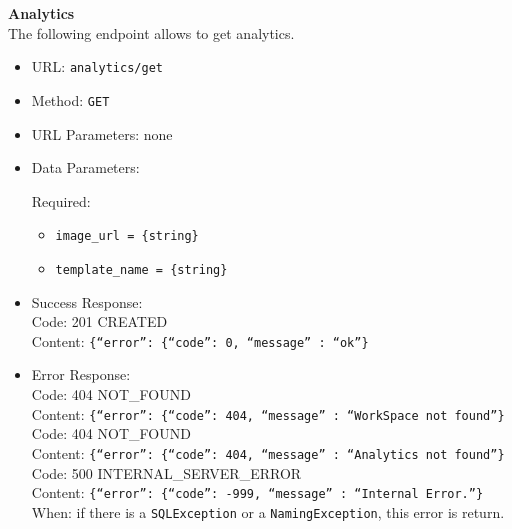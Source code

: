 \noindent\textbf{Analytics}\\
The following endpoint allows to get analytics.

\begin{itemize}
    \item URL: \texttt{analytics/get}
    \item Method: \texttt{GET}
    \item URL Parameters: none
    \item Data Parameters:
    
    Required:
    \begin{itemize}
        \item \texttt{image\_url = \{string\}}
        \item \texttt{template\_name = \{string\}}
    \end{itemize}
    
    
    \item Success Response:\\
    Code: 201 CREATED\\
    Content: \texttt{\{``error'': \{``code'': 0, ``message'' : ``ok''\}}\\
    
    \item Error Response:\\

    Code: 404 NOT\_FOUND\\
    Content: \texttt{\{``error'': \{``code'': 404, ``message'' : ``WorkSpace not found''\}}\\

    Code: 404 NOT\_FOUND\\
    Content: \texttt{\{``error'': \{``code'': 404, ``message'' : ``Analytics not found''\}}\\

    Code: 500 INTERNAL\_SERVER\_ERROR\\
    Content: \texttt{\{``error'': \{``code'': -999, ``message'' : ``Internal Error.''\}}\\
    When: if there is a \texttt{SQLException} or a \texttt{NamingException}, this error is return.\\
    
\end{itemize}

